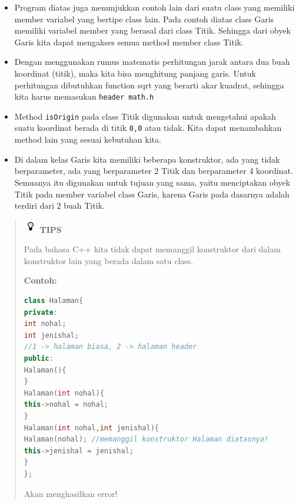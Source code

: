 \begin{itemize}

\item
  Program diatas juga menunjukkan contoh lain dari suatu class yang
  memiliki member variabel yang bertipe class lain. Pada contoh diatas
  class Garis memiliki variabel member yang berasal dari class Titik.
  Sehingga dari obyek Garis kita dapat mengakses semua method member
  class Titik.
\item
  Dengan menggunakan rumus matematis perhitungan jarak antara dua buah
  koordinat (titik), maka kita bisa menghitung panjang garis. Untuk
  perhitungan dibutuhkan function sqrt yang berarti akar kuadrat,
  sehingga kita harus memasukan \texttt{header\ math.h}
\item
  Method \texttt{isOrigin} pada class Titik digunakan untuk mengetahui
  apakah suatu koordinat berada di titik \texttt{0,0} atau tidak. Kita
  dapat menambahkan method lain yang sesuai kebutuhan kita.
\item
  Di dalam kelas Garis kita memiliki beberapa konstruktor, ada yang
  tidak berparameter, ada yang berparameter 2 Titik dan berparameter 4
  koordinat. Semuanya itu digunakan untuk tujuan yang sama, yaitu
  menciptakan obyek Titik pada member variabel class Garis, karena Garis
  pada dasarnya adalah terdiri dari 2 buah Titik.
\end{itemize}

\begin{quotation}
\includegraphics{../manuscript/images/tips.png} \textbf{TIPS} 
	
Pada bahasa C++ kita tidak dapat memanggil konstruktor dari dalam konstruktor
lain yang berada dalam satu class.
	
\textbf{Contoh:}
	
\begin{lstlisting}[language=c++, numbers=none]
class Halaman{
private:
int nohal;
int jenishal;
//1 -> halaman biasa, 2 -> halaman header
public:
Halaman(){
}
Halaman(int nohal){
this->nohal = nohal;
}
Halaman(int nohal,int jenishal){
Halaman(nohal); //memanggil konstruktor Halaman diatasnya!
this->jenishal = jenishal;
}
};
\end{lstlisting}
	
 Akan menghasilkan error!
\end{quotation}

